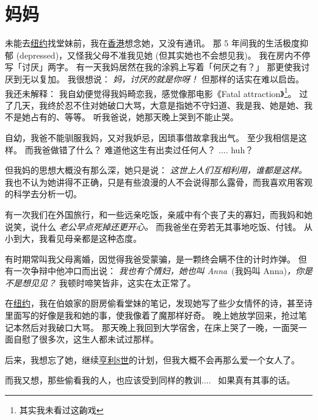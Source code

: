 \documentclass[12pt]{report}
\newcommand{\cc}[2]{#1}
\newcommand{\cc}[2]{#2}
\newcommand{\speechCn}[1]{\textrm{\textit{\textcolor{Speech}{#1}}}}
\begin{document}
\chapter{\cc{妈妈}{Mother}}

\cc{
未能去\uline{纽约}找堂妹前，我在\uline{香港}想念她，又没有通讯。 那 5 年间我的生活极度抑郁 (depressed)，又怪我父母不准我见她 (但其实她也不会想见我)。 我在房内不停写「讨厌」两字。 有一天我妈居然在我的涂鸦上写着「何厌之有？」 那更使我讨厌到无以复加。 我很想说： \speechCn{妈，讨厌的就是你呀！}  但那样的话实在难以启齿。 我还未解释： 我自幼便觉得我妈畸恋我，感觉像那电影《Fatal attraction》\footnote{其实我未看过这齣戏}。 过了几天，我终於忍不住对她破口大骂，大意是指她不守妇道、我是我、她是她、我不是她占有的、等等。 听我爸说，她那天晚上哭到不能止哭。
}{
	
}

\cc{
自幼，我爸不能驯服我妈，又对我妒忌，因琐事借故拿我出气。 至少我相信是这样。 而我爸做错了什么？ 难道他这生有出卖过任何人？ .... huh？
}{
	
}

\cc{
但我妈的思想大概没有那么深，她只是说： \speechCn{这世上人们互相利用，谁都是这样。}  我也不认为她讲得不正确，只是有些浪漫的人不会说得那么露骨，而我喜欢用客观的科学去分析一切。
}{
	
}

\cc{
有一次我们在外国旅行，和一些远亲吃饭，亲戚中有个丧了夫的寡妇，而我妈和她说笑，说什么 \speechCn{老公早点死掉还更开心。}  而我爸坐在旁若无其事地吃饭、付钱。 从小到大，我看见母亲都是这种态度。
}{
	
}

\cc{
有时期常叫我父母离婚，因觉得我爸受蒙骗，是一颗终会瞒不住的计时炸弹。 但有一次争辩中他冲口而出说： \speechCn{我也有个情妇，她也叫 Anna}\ (我妈叫 Anna)\speechCn{，你是不是想见见？}  我顿时啼笑皆非，这实在太正常了。
}{
	
}

\cc{
在\uline{纽约}，我在伯娘家的厨房偷看堂妹的笔记，发现她写了些少女情怀的诗，甚至诗里面写的好像是我和她的事，使我像着了魔那样好奇。 晚上她放学回来，抢过笔记本然后对我破口大骂。 那天晚上我回到大学宿舍，在床上哭了一晚，一面哭一面自慰了很多次，这生人都未试过那样。
}{
	
}

\cc{
后来，我想忘了她，继续\uline{亨利8世}的计划，但我大概不会再那么爱一个女人了。
}{
	
}

\cc{
而我又想，那些偷看我的人，也应该受到同样的教训....~ 如果真有其事的话。
}{
	
}
\end{document}
